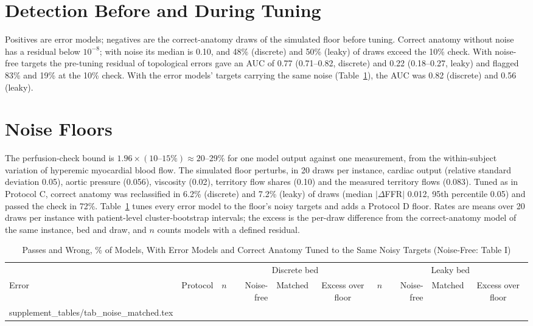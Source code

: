 \documentclass[journal,twoside,web,onecolumn]{ieeecolor}
\begin{document}
\FloatBarrier
{}
\section{Detection Before and During Tuning}\label{sec:detector}
Positives are error models; negatives are the correct-anatomy draws of the simulated floor before tuning. Correct anatomy without noise has a residual below $10^{-8}$; with noise its median is 0.10, and 48\% (discrete) and 50\% (leaky) of draws exceed the 10\% check. With noise-free targets the pre-tuning residual of topological errors gave an AUC of 0.77 (0.71--0.82, discrete) and 0.22 (0.18--0.27, leaky) and flagged 83\% and 19\% at the 10\% check. With the error models' targets carrying the same noise (Table~\ref{tab:matched}), the AUC was 0.82 (discrete) and 0.56 (leaky).

\FloatBarrier
{}
\section{Noise Floors}\label{sec:floor}
The perfusion-check bound is $1.96 \times (10\text{--}15\%) \approx 20$--29\% for one model output against one
measurement, from the within-subject variation of hyperemic myocardial blood flow. The simulated floor perturbs,
in 20 draws per instance, cardiac output (relative standard deviation 0.05), aortic pressure (0.056), viscosity (0.02),
territory flow shares (0.10) and the measured territory flows (0.083). Tuned as in Protocol C, correct anatomy was reclassified in 6.2\% (discrete) and 7.2\% (leaky) of draws (median $|\Delta$FFR$|$ 0.012, 95th percentile 0.05) and passed the check in 72\%.
Table~\ref{tab:matched} tunes every error model to the floor's noisy targets and adds a Protocol D floor. Rates are means over 20 draws per instance with patient-level cluster-bootstrap intervals; the excess is the per-draw difference from the correct-anatomy model of the same instance, bed and draw, and $n$ counts models with a defined residual.
\begin{table}[!ht]
\caption{Passes and Wrong, \% of Models, With Error Models and Correct Anatomy Tuned to the Same Noisy Targets (Noise-Free: Table I)}\label{tab:matched}
\centering\footnotesize\setlength{\tabcolsep}{4pt}
\begin{tabular}{@{}llrrccrrcc@{}}
\toprule
 & & \multicolumn{4}{c}{Discrete bed} & \multicolumn{4}{c}{Leaky bed}\\
\cmidrule(lr){3-6}\cmidrule(l){7-10}
Error & Protocol & $n$ & Noise-free & Matched & Excess over floor & $n$ & Noise-free & Matched & Excess over floor\\
\midrule
{} supplement_tables/tab_noise_matched.tex 
\bottomrule
\end{tabular}
\end{table}
\end{document}
